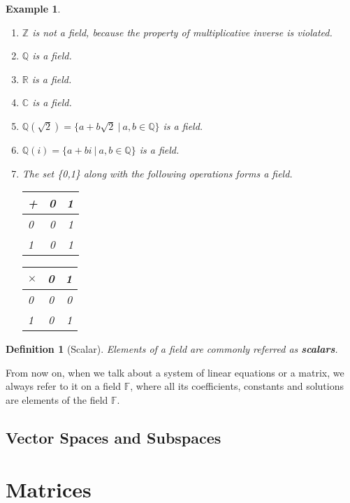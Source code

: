 \documentclass{article}
\newtheorem{definition}{Definition}[section] %
\newtheorem{example}{Example}[section]
\begin{document}
\begin{example} \
    \begin{enumerate}
        \item $\mathbb{Z}$ is not a field, because the property of \textit{multiplicative inverse} is violated.
        \item $\mathbb{Q}$ is a field.
        \item $\mathbb{R}$ is a field.
        \item $\mathbb{C}$ is a field.
        \item $\mathbb{Q}(\sqrt{2})=\{a+b\sqrt{2} \ |\ a,b \in \mathbb{Q} \}$ is a field.
        \item $\mathbb{Q}(i)=\{a+bi \ |\ a,b \in \mathbb{Q} \}$ is a field.
        \item The set \{0,1\} along with the following operations forms a field. \\
        \begin{multicols}{2}
            \noindent
            \begin{tabular}{l|cr}
                + & 0 & 1 \\
                \hline
                0 & 0 & 1 \\
                1 & 0 & 1
            \end{tabular}
            
            \columnbreak
            
            \noindent
            \begin{tabular}{l|cr}
                $\times$ & 0 & 1 \\
                \hline
                0 & 0 & 0 \\
                1 & 0 & 1
        \end{tabular}
        \end{multicols}
    \end{enumerate}
\end{example}

\begin{definition}[Scalar]
    Elements of a field are commonly referred as \textbf{scalars}.
\end{definition}

From now on, when we talk about a system of linear equations or a matrix, we always refer to it on a field $\mathbb{F}$, where all its coefficients, constants and solutions are elements of the field $\mathbb{F}$.

\subsection{Vector Spaces and Subspaces}




\section{Matrices}









\end{document}
